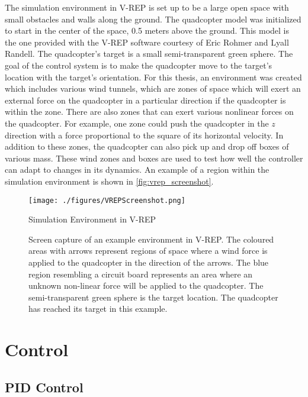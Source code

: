 \documentclass[letterpaper,12pt,titlepage,oneside,final]{book}
\begin{document}

The simulation environment in V-REP is set up to be a large open space with small obstacles and walls along the ground. 
The quadcopter model was initialized to start in the center of the space, 0.5 meters above the ground. 
This model is the one provided with the V-REP software courtesy of Eric Rohmer and Lyall Randell. 
The quadcopter's target is a small semi-transparent green sphere. The goal of the control system is to make the quadcopter move to the target's location with the target's orientation. 
For this thesis, an environment was created which includes various wind tunnels, which are zones of space which will exert an external force on the quadcopter in a particular direction if the quadcopter is within the zone. 
There are also zones that can exert various nonlinear forces on the quadcopter. 
For example, one zone could push the quadcopter in the $z$ direction with a force proportional to the square of its horizontal velocity. 
In addition to these zones, the quadcopter can also pick up and drop off boxes of various mass. 
These wind zones and boxes are used to test how well the controller can adapt to changes in its dynamics.
An example of a region within the simulation environment is shown in \autoref{fig:vrep_screenshot}.

\begin{figure}
\centering
\texttt{[image: ./figures/VREPScreenshot.png]}
\caption{Simulation Environment in V-REP}
\label{fig:vrep_screenshot}
\captionsetup{singlelinecheck=off,font=footnotesize}
\caption*{
Screen capture of an example environment in V-REP. The coloured areas with arrows represent regions of space where a wind force is applied to the quadcopter in the direction of the arrows. The blue region resembling a circuit board represents an area where an unknown non-linear force will be applied to the quadcopter. The semi-transparent green sphere is the target location. The quadcopter has reached its target in this example.}
\end{figure}

\chapter{Control} \label{chap:control}

\section{PID Control}
\end{document}
